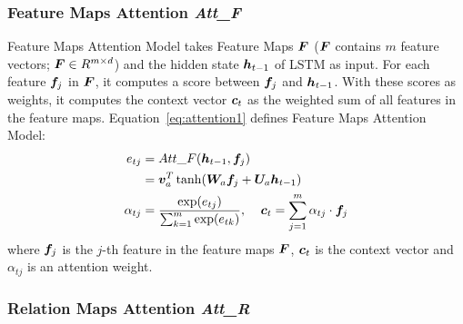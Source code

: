 \documentclass[11pt,a4paper]{article}
\begin{document}
\subsubsection{Feature Maps Attention \textit{Att\_F}}
Feature Maps Attention Model takes Feature Maps ${\boldsymbol F}$ (${\boldsymbol F}$ contains $m$ feature vectors; ${\boldsymbol F} \in R^{m\times d}$) and the hidden state ${\boldsymbol h}_{t-1}$ of LSTM as input. For each feature ${\boldsymbol f}_j$ in ${\boldsymbol F}$, it computes a score between ${\boldsymbol f}_j$ and ${\boldsymbol h}_{t-1}$. With these scores as weights, it computes the context vector ${\boldsymbol c}_t$
as the weighted sum of all features in the feature maps. Equation~\ref{eq:attention1} defines Feature Maps Attention Model:
\begin{align}
e_{tj} & = Att\_F({\boldsymbol h}_{t-1}, {\boldsymbol f}_j) \label{eq:attention1}  \\
 & = {\boldsymbol v}^T_a \tanh({\boldsymbol W}_a {\boldsymbol f}_{j} + {\boldsymbol U}_a {\boldsymbol h}_{t-1}) \nonumber  \\
\alpha_{tj} & = \frac{\exp(e_{tj})}{\sum_{k=1}^{m}\exp(e_{tk})},
\:\:\:\:\:{\boldsymbol c}_t = \sum_{j=1}^{m}\alpha_{tj} \cdot {\boldsymbol f}_j \nonumber 
\end{align}
where ${\boldsymbol f}_j$ is the $j$-th feature in the feature maps ${\boldsymbol F}$, ${\boldsymbol c}_t$ is the context vector and $\alpha_{tj}$ is an attention weight.



\subsubsection{Relation Maps Attention \textit{Att\_R}} 


\end{document}
